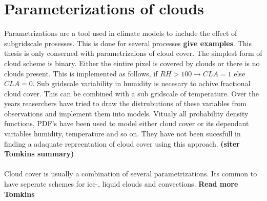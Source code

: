 \section{Parameterizations of clouds} \label{sec:param_clouds}
Parametrizations are a tool used in climate models to include the effect of subgridscale prosesses. This is done for several processes \textbf{give examples}. This thesis is only conserned with parametrizaions of cloud cover. The simplest form of cloud scheme is binary. Either the eintire pixel is covered by clouds or there is no clouds present. This is implemented as follows, if $RH > 100 \rightarrow CLA = 1$ else $CLA = 0$.
Sub gridscale variability in humidity is necesary to achive fractional cloud cover. This can be combined with a sub gridscale of temperature. Over the years reaserchers have tried to draw the distrubutions of these variables from observations and implement them into models. Vitualy all probability density functions, PDF's have been used to model either cloud cover or its dependant variables humidity, temperature and so on. They have not been sucesfull in finding a adaquate repreentation of cloud cover using this approach. \textbf{(siter Tomkins summary)}
\\ \\
Cloud cover is usually a combination of several parametrizations. Its common to have seperate schemes for ice-, liquid clouds and convections.
\textbf{Read more Tomkins}
\\ \\ 
